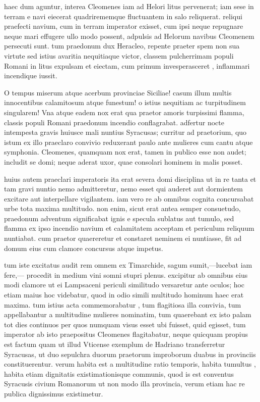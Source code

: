  haec dum aguntur, interea Cleomenes iam ad Helori litus pervenerat; iam sese in terram e navi eiecerat quadrirememque fluctuantem in salo reliquerat. reliqui praefecti navium, cum in terram imperator exisset, cum ipsi neque repugnare neque mari effugere ullo modo possent, adpulsis ad Helorum navibus Cleomenem persecuti sunt. tum praedonum dux Heracleo, repente praeter spem non sua virtute sed istius avaritia nequitiaque victor, classem pulcherrimam populi Romani in litus expulsam et eiectam, cum primum invesperasceret , inflammari incendique iussit.

 O tempus miserum atque acerbum provinciae Siciliae! casum illum multis innocentibus calamitosum atque funestum! o istius nequitiam ac turpitudinem singularem! Vna atque eadem nox erat qua praetor amoris turpissimi flamma, classis populi Romani praedonum incendio conflagrabat. adfertur nocte intempesta gravis huiusce mali nuntius Syracusas; curritur ad praetorium, quo istum ex illo praeclaro convivio reduxerant paulo ante mulieres cum cantu atque symphonia. Cleomenes, quamquam nox erat, tamen in publico esse non audet; includit se domi; neque aderat uxor, quae consolari hominem in malis posset.

 huius autem praeclari imperatoris ita erat severa domi disciplina ut in re tanta et tam gravi nuntio nemo admitteretur, nemo esset qui auderet aut dormientem excitare aut interpellare vigilantem. iam vero re ab omnibus cognita concursabat urbe tota maxima multitudo. non enim, sicut erat antea semper consuetudo, praedonum adventum significabat ignis e specula sublatus aut tumulo, sed flamma ex ipso incendio navium et calamitatem acceptam et periculum reliquum nuntiabat. cum praetor quaereretur et constaret neminem ei nuntiasse, fit ad domum eius cum clamore concursus atque impetus.

 tum iste excitatus audit rem omnem ex Timarchide, sagum sumit,—lucebat iam fere,— procedit in medium vini somni stupri plenus. excipitur ab omnibus eius modi clamore ut ei Lampsaceni periculi similitudo versaretur ante oculos; hoc etiam maius hoc videbatur, quod in odio simili multitudo hominum haec erat maxima. tum istius acta commemorabatur , tum flagitiosa illa convivia, tum appellabantur a multitudine mulieres nominatim, tum quaerebant ex isto palam tot dies continuos per quos numquam visus esset ubi fuisset, quid egisset, tum imperator ab isto praepositus Cleomenes flagitabatur, neque quicquam propius est factum quam ut illud Vticense exemplum de Hadriano transferretur Syracusas, ut duo sepulchra duorum praetorum improborum duabus in provinciis constituerentur. verum habita est a multitudine ratio temporis, habita tumultus , habita etiam dignitatis existimationisque communis, quod is est conventus Syracusis civium Romanorum ut non modo illa provincia, verum etiam hac re publica dignissimus existimetur.

